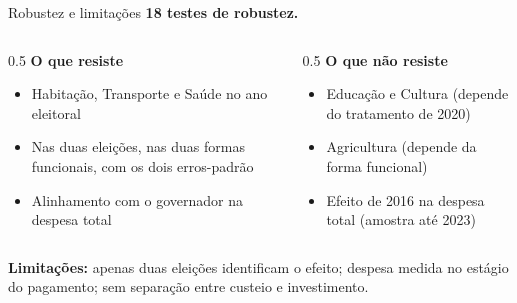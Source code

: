 \documentclass[aspectratio=169,9pt]{beamer}
\begin{document}
\begin{frame}{Robustez e limitações}
  \textbf{18 testes de robustez.}
  \vspace{0.5em}
  \begin{columns}[T]
    \begin{column}{0.5\textwidth}
      \textbf{O que resiste}
      \begin{itemize}
        \item Habitação, Transporte e Saúde no ano eleitoral
        \item Nas duas eleições, nas duas formas funcionais, com os dois erros-padrão
        \item Alinhamento com o governador na despesa total
      \end{itemize}
    \end{column}
    \begin{column}{0.5\textwidth}
      \textbf{O que não resiste}
      \begin{itemize}
        \item Educação e Cultura (depende do tratamento de 2020)
        \item Agricultura (depende da forma funcional)
        \item Efeito de 2016 na despesa total (amostra até 2023)
      \end{itemize}
    \end{column}
  \end{columns}
  \vspace{0.5em}
  \textbf{Limitações:} apenas duas eleições identificam o efeito; despesa medida no estágio do pagamento; sem separação entre custeio e investimento.
\end{frame}
\end{document}
